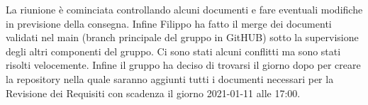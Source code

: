 La riunione è cominciata controllando alcuni documenti e fare eventuali modifiche in previsione della consegna. Infine Filippo ha fatto il merge dei documenti validati nel main (branch principale del gruppo in GitHUB) sotto la supervisione degli altri componenti del gruppo. Ci sono stati alcuni conflitti ma sono stati risolti velocemente. Infine il gruppo ha deciso di trovarsi il giorno dopo per creare la repository nella quale saranno aggiunti tutti i documenti necessari per la Revisione dei Requisiti con scadenza il giorno 2021-01-11 alle 17:00.
